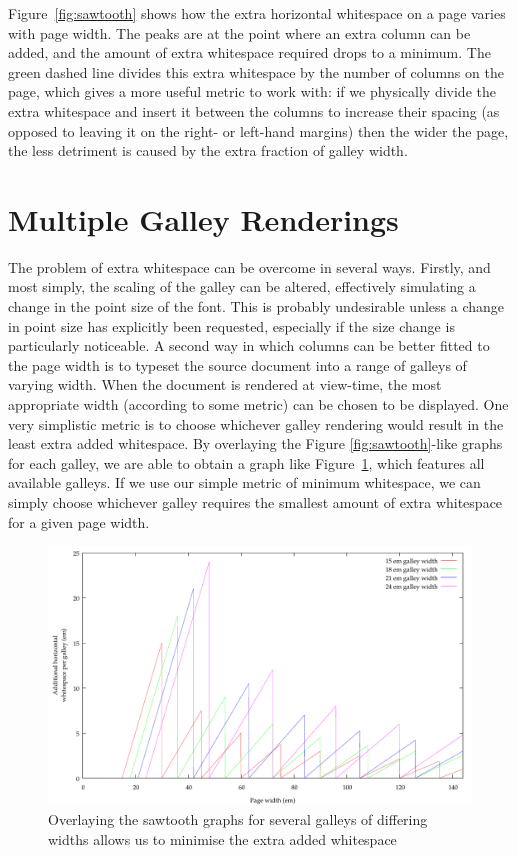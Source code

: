 Figure~\ref{fig:sawtooth} shows how the extra horizontal whitespace on a page varies with page width. The peaks are at the point where an extra column can be added, and the amount of extra whitespace required drops to a minimum. The green dashed line divides this extra whitespace by the number of columns on the page, which gives a more useful metric to work with: if we physically divide the extra whitespace and insert it between the columns to increase their spacing (as opposed to leaving it on the right- or left-hand margins) then the wider the page, the less detriment is caused by the extra fraction of galley width.

\section{Multiple Galley Renderings}
The problem of extra whitespace can be overcome in several ways. Firstly, and most simply, the scaling of the galley can be altered, effectively simulating a change in the point size of the font. This is probably undesirable unless a change in point size has explicitly been requested, especially if the size change is particularly noticeable.
A second way in which columns can be better fitted to the page width is to typeset the source document into a range of galleys of varying width. When the document is rendered at view-time, the most appropriate width (according to some metric) can be chosen to be displayed. One very simplistic metric is to choose whichever galley rendering would result in the least extra added whitespace. By overlaying the Figure \mbox{\ref{fig:sawtooth}-like} graphs for each galley, we are able to obtain a graph like Figure~\ref{fig:overlay}, which features all available galleys. If we use our simple metric of minimum whitespace, we can simply choose whichever galley requires the smallest amount of extra whitespace for a given page width.

\begin{figure}
 \includegraphics[width=\textwidth]{gnuplot/overlay}
 \caption[Extra whitespace in a multiple galley document]{Overlaying the sawtooth graphs for several galleys of differing widths allows us to minimise the extra added whitespace}
 \label{fig:overlay}
\end{figure}

